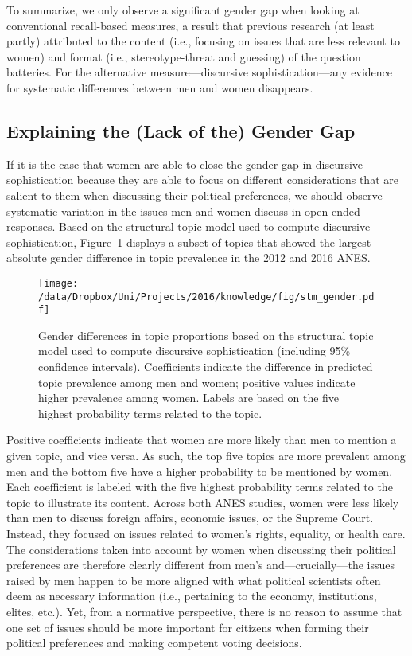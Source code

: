 To summarize, we only observe a significant gender gap when looking at conventional recall-based measures, a result that previous research (at least partly) attributed to the content (i.e., focusing on issues that are less relevant to women) and format (i.e., stereotype-threat and guessing) of the question batteries. For the alternative measure---discursive sophistication---any evidence for systematic differences between men and women disappears.


\subsection{Explaining the (Lack of the) Gender Gap}
If it is the case that women are able to close the gender gap in discursive sophistication because they are able to focus on different considerations that are salient to them when discussing their political preferences, we should observe systematic variation in the issues men and women discuss in open-ended responses. Based on the structural topic model used to compute discursive sophistication, Figure~\ref{fig:stm_gender} displays a subset of topics that showed the largest absolute gender difference in topic prevalence in the 2012 and 2016 ANES.

\begin{figure}[h]\centering
\texttt{[image: /data/Dropbox/Uni/Projects/2016/knowledge/fig/stm\_gender.pdf]}
\caption{Gender differences in topic proportions based on the structural topic model used to compute discursive sophistication (including 95\% confidence intervals). Coefficients indicate the difference in predicted topic prevalence among men and women; positive values indicate higher prevalence among women. Labels are based on the five highest probability terms related to the topic.
}\label{fig:stm_gender}
\end{figure}

Positive coefficients indicate that women are more likely than men to mention a given topic, and vice versa. As such, the top five topics are more prevalent among men and the bottom five have a higher probability to be mentioned by women. Each coefficient is labeled with the five highest probability terms related to the topic to illustrate its content. Across both ANES studies, women were less likely than men to discuss foreign affairs, economic issues, or the Supreme Court. Instead, they focused on issues related to women's rights, equality, or health care. The considerations taken into account by women when discussing their political preferences are therefore clearly different from men's and---crucially---the issues raised by men happen to be more aligned with what political scientists often deem as necessary information (i.e., pertaining to the economy, institutions, elites, etc.). Yet, from a normative perspective, there is no reason to assume that one set of issues should be more important for citizens when forming their political preferences and making competent voting decisions.



